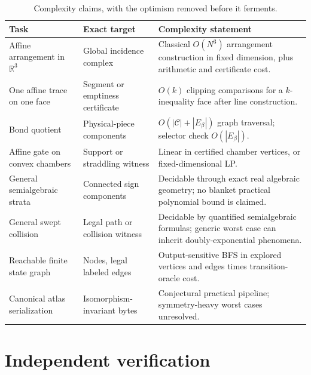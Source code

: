 \documentclass[11pt,openany]{book}
\newcommand{\R}{\mathbb R}
\theoremstyle{polyplain}
\theoremstyle{polydef}
\begin{document}
\begin{table}[htbp]
\centering
\small
\begin{tabularx}{\textwidth}{L{0.25\textwidth}L{0.24\textwidth}Y}
\toprule
\textbf{Task} & \textbf{Exact target} & \textbf{Complexity statement}\\
\midrule
Affine arrangement in $\R^3$ & Global incidence complex & Classical $O(N^3)$ arrangement construction in fixed dimension, plus arithmetic and certificate cost.\\
One affine trace on one face & Segment or emptiness certificate & $O(k)$ clipping comparisons for a $k$-inequality face after line construction.\\
Bond quotient & Physical-piece components & $O(|\mathcal C|+|E_\beta|)$ graph traversal; selector check $O(|E_\beta|)$.\\
Affine gate on convex chambers & Support or straddling witness & Linear in certified chamber vertices, or fixed-dimensional LP.\\
General semialgebraic strata & Connected sign components & Decidable through exact real algebraic geometry; no blanket practical polynomial bound is claimed.\\
General swept collision & Legal path or collision witness & Decidable by quantified semialgebraic formulas; generic worst case can inherit doubly-exponential phenomena.\\
Reachable finite state graph & Nodes, legal labeled edges & Output-sensitive BFS in explored vertices and edges times transition-oracle cost.\\
Canonical atlas serialization & Isomorphism-invariant bytes & Conjectural practical pipeline; symmetry-heavy worst cases unresolved.\\
\bottomrule
\end{tabularx}
\caption{Complexity claims, with the optimism removed before it ferments.}
\label{tab:complexity}
\end{table}

\section{Independent verification}
\end{document}
